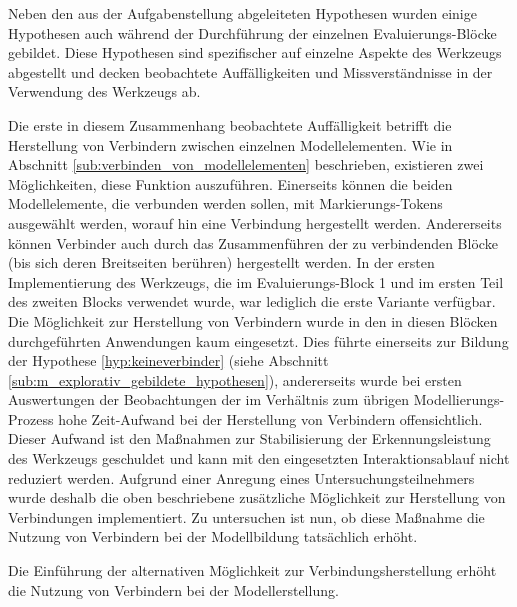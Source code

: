 Neben den aus der Aufgabenstellung abgeleiteten Hypothesen wurden einige Hypothesen auch während der Durchführung der einzelnen Evaluierungs-Blöcke gebildet. Diese Hypothesen sind spezifischer auf einzelne Aspekte des Werkzeugs abgestellt und decken beobachtete Auffälligkeiten und Missverständnisse in der Verwendung des Werkzeugs ab. 

Die erste in diesem Zusammenhang beobachtete Auffälligkeit betrifft die Herstellung von Verbindern zwischen einzelnen Modellelementen. Wie in Abschnitt \ref{sub:verbinden_von_modellelementen} beschrieben, existieren zwei Möglichkeiten, diese Funktion auszuführen. Einerseits können die beiden Modellelemente, die verbunden werden sollen, mit Markierungs-Tokens ausgewählt werden, worauf hin eine Verbindung hergestellt werden. Andererseits können Verbinder auch durch das Zusammenführen der zu verbindenden Blöcke (bis sich deren Breitseiten berühren) hergestellt werden. In der ersten Implementierung des Werkzeugs, die im Evaluierungs-Block 1 und im ersten Teil des zweiten Blocks verwendet wurde, war lediglich die erste Variante verfügbar. Die Möglichkeit zur Herstellung von Verbindern wurde in den in diesen Blöcken durchgeführten Anwendungen kaum eingesetzt. Dies führte einerseits zur Bildung der Hypothese \ref{hyp:keineverbinder} (siehe Abschnitt \ref{sub:m_explorativ_gebildete_hypothesen}), andererseits wurde bei ersten Auswertungen der Beobachtungen der im Verhältnis zum übrigen Modellierungs-Prozess hohe Zeit-Aufwand bei der Herstellung von Verbindern offensichtlich. Dieser Aufwand ist den Maßnahmen zur Stabilisierung der Erkennungsleistung des Werkzeugs geschuldet und kann mit den eingesetzten Interaktionsablauf nicht reduziert werden. Aufgrund einer Anregung eines Untersuchungsteilnehmers wurde deshalb die oben beschriebene zusätzliche Möglichkeit zur Herstellung von Verbindungen implementiert. Zu untersuchen ist nun, ob diese Maßnahme die Nutzung von Verbindern bei der Modellbildung tatsächlich erhöht.

\begin{hyp}
	\label{hyp:verbinder}
	Die Einführung der alternativen Möglichkeit zur Verbindungsherstellung erhöht die Nutzung von Verbindern bei der Modellerstellung.
\end{hyp}


